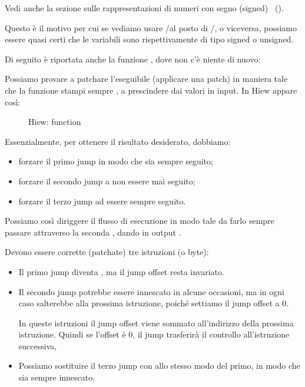 Vedi anche la sezione sulle rappresentazioni di numeri con segno (signed) ~().

Questo è il motivo per cui se vediamo usare \JG/\JL al posto di \JA/\JB, o viceversa, 
possiamo essere quasi certi che le variabili sono rispettivamente di tipo signed o unsigned.

Di seguito è riportata anche la funzione \main, dove non c'è niente di nuovo:





\clearpage
{}

Possiamo provare a patchare l'eseguibile (applicare una patch) in maniera tale che la funzione  stampi sempre , 
a prescindere dai valori in input.
In Hiew appare così:

\begin{figure}[H]
\centering
{}
\caption{Hiew:  function}
\label{fig:jcc_hiew_1}
\end{figure}

Essenzialmente, per ottenere il risultato desiderato, dobbiamo:
\begin{itemize}
\item forzare il primo jump in modo che sia sempre seguito;
\item forzare il secondo jump a non essere mai seguito;
\item forzare il terzo jump ad essere sempre seguito.
\end{itemize}

Possiamo così diriggere il flusso di esecuzione in modo tale da farlo sempre passare attraverso la seconda \printf, dando in output .

Devono essere corrette (patchate) tre istruzioni (o byte):

\begin{itemize}
\item Il primo jump diventa \JMP, ma il \gls{jump offset} resta invariato.

\item 
Il secondo jump potrebbe essere innescato in alcune occasioni, ma in ogni caso salterebbe alla prossima istruzione, poiché settiamo il \gls{jump offset} a 0.

In queste istruzioni il \gls{jump offset} viene sommato all'indirizzo della prossima istruzione.
Quindi se l'offset è 0, il jump trasferirà il controllo all'istruzione successiva,

\item 
Possiamo sostituire il terzo jump con \JMP allo stesso modo del primo, in modo che sia sempre innescato.

\end{itemize}

